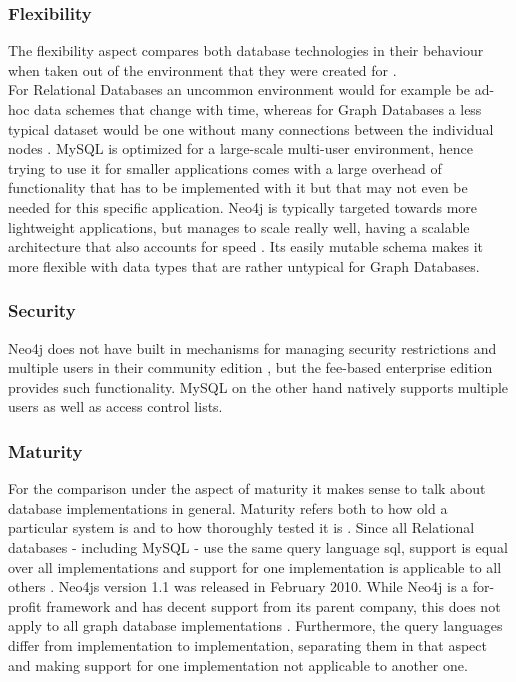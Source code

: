 \subsubsection{Flexibility}
The flexibility aspect compares both database technologies in their behaviour when taken out of the environment that they were created for \autocite{Vicknair2010}. \\
For Relational Databases an uncommon environment would for example be ad-hoc data schemes that change with time, whereas for Graph Databases a less typical dataset would be one without many connections between the individual nodes  \autocite{GarimaAnalysis}.
MySQL is optimized for a large-scale multi-user environment, hence trying to use it for smaller applications comes with a large overhead of functionality that has to be implemented with it but that may not even be needed for this specific application.
Neo4j is typically targeted towards more lightweight applications, but manages to scale really well, having a scalable architecture that also accounts for speed \autocite{neo4jweb}. Its easily mutable schema makes it more flexible with data types that are rather untypical for Graph Databases.

\subsubsection{Security}
Neo4j does not have built in mechanisms for managing security restrictions and multiple users in their community edition \autocite{GarimaAnalysis}, but the fee-based enterprise edition provides such functionality. MySQL on the other hand natively supports multiple users as well as access control lists. \autocite{mysqlsecurity}

\subsubsection{Maturity}
For the comparison under the aspect of maturity it makes sense to talk about database implementations in general. Maturity refers both to how old a particular system is and to how thoroughly tested it is \autocite{Vicknair2010}.
Since all Relational databases - including MySQL - use the same query language \gls{sql}, support is equal over all implementations and support for one implementation is applicable to all others \autocite{GarimaAnalysis}.
Neo4js version 1.1 was released in February 2010. While Neo4j is a for-profit framework and has decent support from its parent company, this does not apply to all graph database implementations \autocite{Vicknair2010}. Furthermore, the query languages differ from implementation to implementation, separating them in that aspect and making support for one implementation not applicable to another one.


